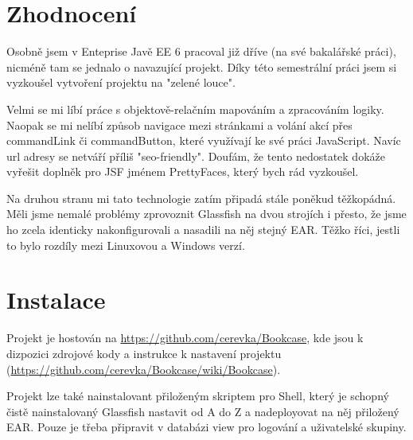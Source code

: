 \documentclass[12pt]{article}
\begin{document}
\section{Zhodnocení}

Osobně jsem v Enteprise Javě EE 6 pracoval již dříve (na své bakalářské práci), nicméně tam se jednalo o navazující projekt. Díky této semestrální práci jsem si vyzkoušel vytvoření projektu na "zelené louce".

Velmi se mi líbí práce s objektově-relačním mapováním a zpracováním logiky. Naopak se mi nelíbí způsob navigace mezi stránkami a volání akcí přes commandLink či commandButton, které využívají ke své práci JavaScript. Navíc url adresy se netváří příliš "seo-friendly". Doufám, že tento nedostatek dokáže vyřešit doplněk pro JSF jménem PrettyFaces, který bych rád vyzkoušel.

Na druhou stranu mi tato technologie zatím připadá stále poněkud těžkopádná. Měli jsme nemalé problémy zprovoznit Glassfish na dvou strojích i přesto, že jsme ho zcela identicky nakonfigurovali a nasadili na něj stejný EAR. Těžko říci, jestli to bylo rozdíly mezi Linuxovou a Windows verzí.

\section{Instalace}

Projekt je hostován na \url{https://github.com/cerevka/Bookcase}, kde jsou k dizpozici zdrojové kody a instrukce k nastavení projektu (\url{https://github.com/cerevka/Bookcase/wiki/Bookcase}).

Projekt lze také nainstalovant přiloženým skriptem pro Shell, který je schopný čistě nainstalovaný Glassfish nastavit od A do Z a nadeployovat na něj přiložený EAR. Pouze je třeba připravit v databázi view pro logování a uživatelské skupiny.
\end{document}

